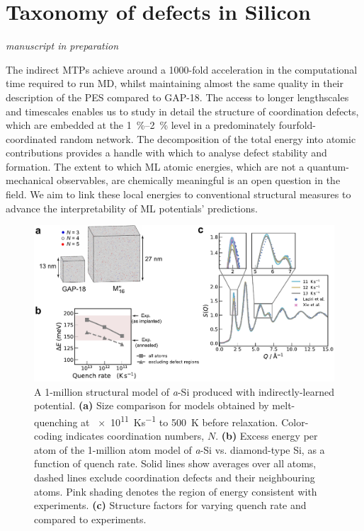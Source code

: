 \documentclass[12pt,a4paper,twoside,nobind]{ociamthesis}
\begin{document}
\section{Taxonomy of defects in Silicon}
{\vspace{-2.2em}  \begin{flushright} \small{\emph{manuscript in preparation}} \end{flushright}}

The indirect MTPs achieve around a 1000-fold acceleration in the computational time required to run MD, whilst maintaining almost the same quality in their description of the PES compared to GAP-18.
The access to longer lengthscales and timescales enables us to study in detail the structure of coordination defects,
which are embedded at the \SIrange{1}{2}{\%} level in a predominately fourfold-coordinated random network. The decomposition of the total energy into atomic contributions provides a handle with which 
to analyse defect stability and formation. The extent to which ML atomic energies, which are not a quantum-mechanical observables, are chemically meaningful is an open question in the field.
We aim to link these local energies to conventional structural measures to advance the interpretability of ML potentials' predictions. 

 \begin{figure}[ht]
  \centering
  \includegraphics[width=\linewidth]{rejig_fig1_tos.pdf}
  \caption{
  A 1-million structural model of \emph{a}-Si produced with indirectly-learned potential. \textbf{(a)} Size comparison for models
  obtained by melt-quenching at \SI{e11}{Ks^{-1}} to \SI{500}{K} before relaxation. Color-coding indicates coordination numbers, $N$. 
  \textbf{(b)} Excess energy per atom of the 1-million atom model of \emph{a}-Si vs. diamond-type Si, as a function of quench rate. Solid lines show averages over all atoms, 
  dashed lines exclude coordination defects and their neighbouring atoms.
  Pink shading denotes the region of energy consistent with experiments.\autocite{Roorda1991}
  \textbf{(c)} Structure factors for varying quench rate and compared to experiments.\autocite{Laaziri1999,Xie2013}
  }
  \label{fig:defects1}
\end{figure}
\end{document}
